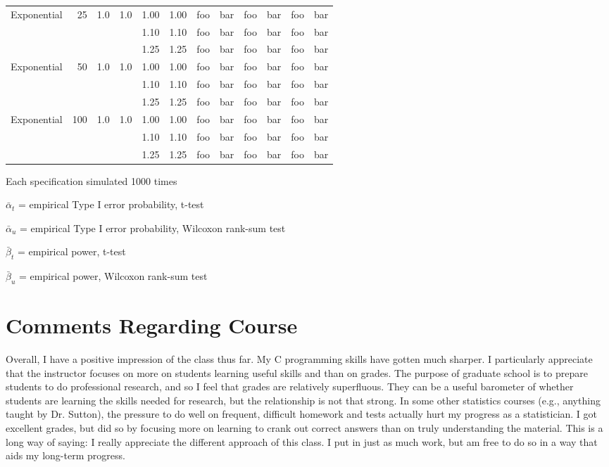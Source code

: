 \documentclass{report}
\begin{document}
\begin{table}[h]
\begin{threeparttable}
\begin{tabular}{|l r r r r r r r r r r r|}
		Exponential & 25 & 1.0 & 1.0 & 1.00 & 1.00 & foo & bar & foo & bar& foo & bar \\
		       &    &     &     & 1.10 & 1.10     & foo & bar & foo & bar & foo & bar \\
		       &    &     &     & 1.25 & 1.25    & foo & bar & foo & bar & foo & bar \\
		Exponential & 50 & 1.0 & 1.0 & 1.00 & 1.00 & foo & bar & foo & bar & foo & bar \\
		       &    &     &     & 1.10 & 1.10    & foo & bar & foo & bar & foo & bar \\
		       &    &     &     & 1.25 & 1.25    & foo & bar & foo & bar & foo & bar \\
		Exponential & 100 & 1.0 & 1.0 & 1.00 & 1.00 & foo & bar & foo & bar & foo & bar \\
		       &    &     &     & 1.10 & 1.10      & foo & bar & foo & bar & foo & bar \\
		       &    &     &     & 1.25 & 1.25     & foo & bar & foo & bar & foo & bar \\

		\hline
	\end{tabular}
		\begin{tablenotes}
		\item Each specification simulated 1000 times
		\item $\bar{\alpha}_t$ = empirical Type I error probability, t-test
		\item $\bar{\alpha}_u$ = empirical Type I error probability,
			Wilcoxon rank-sum test
		\item $\bar{\beta}_t$ = empirical power, t-test
		\item $\bar{\beta}_u$ = empirical power, Wilcoxon rank-sum test
		\end{tablenotes}
	\end{threeparttable}
\end{table}

\section*{Comments Regarding Course}

Overall, I have a positive impression of the class thus far. My C programming
skills have gotten much sharper. I particularly appreciate that the instructor
focuses on more on students learning useful skills and than on grades. The purpose of
graduate school is to prepare students to do professional research, and so 
I feel that grades are relatively superfluous. They can be a useful
barometer of whether students are learning the skills needed for research, but the
relationship is not that strong. In some other statistics courses (e.g.,
anything taught by Dr. Sutton), the pressure 
to do well on frequent, difficult homework and tests actually hurt my
progress as a statistician. I got excellent grades, but did so by focusing more on 
learning to crank out correct answers than on truly understanding the material. 
This is a long way of saying: I really appreciate the different approach of this
class. I put in just as much work, but am free to do so in a way that aids my
long-term progress. 
\end{document}
